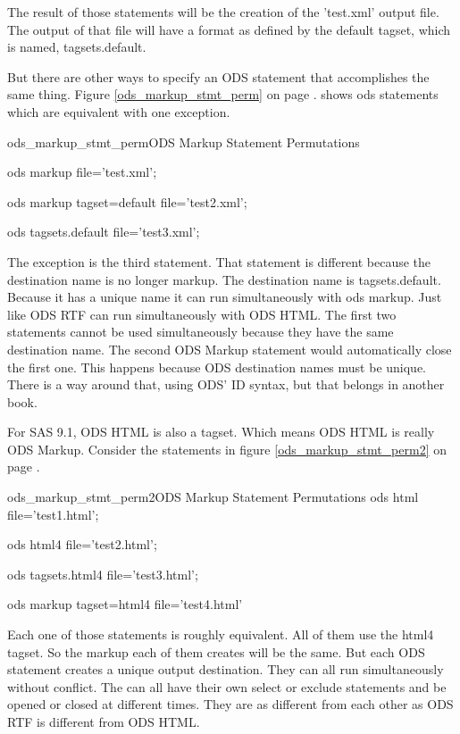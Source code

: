 
The result of those statements will be the creation of the 'test.xml' output
file.  The output of that file will have a format as defined by the default
tagset, which is named, tagsets.default.

But there are other ways to specify an ODS statement that accomplishes the same thing.
Figure \ref{ods_markup_stmt_perm} on page \pageref{ods_markup_stmt_perm}.
shows ods statements which are equivalent with one exception.

\begin{fvcode}{ods_markup_stmt_perm}{ODS Markup Statement Permutations}

    ods markup file='test.xml';

    ods markup tagset=default file='test2.xml';

    ods tagsets.default file='test3.xml';

\end{fvcode}

The exception is the third statement.  That statement is different because the destination
name is no longer markup.  The destination name is tagsets.default.   Because it has a
unique name it can run simultaneously with ods markup.  Just like ODS RTF can run simultaneously
with ODS HTML.  The first two statements cannot be used simultaneously because they have the
same destination name.  The second ODS Markup 
statement would automatically close the first one.  This happens because ODS destination names
must be unique.  There is a way around that, using ODS' ID syntax, but that belongs in another
book.

For SAS 9.1, ODS HTML is also a tagset.  Which means ODS HTML is really ODS Markup.  Consider
the statements in figure \ref{ods_markup_stmt_perm2} on page \pageref{ods_markup_stmt_perm2}.

\begin{fvcode}{ods_markup_stmt_perm2}{ODS Markup Statement Permutations}
    ods html file='test1.html';

    ods html4 file='test2.html';

    ods tagsets.html4 file='test3.html';

    ods markup tagset=html4 file='test4.html'
\end{fvcode}

Each one of those statements is roughly equivalent.  All of them use the html4 tagset.  So
the markup each of them creates will be the same.  But each ODS statement creates a unique
output destination.  They can all run simultaneously without conflict.  The can all have their
own select or exclude statements and be opened or closed at different times.   
They are as different from each other as ODS RTF is different from ODS HTML.

